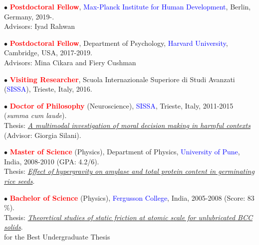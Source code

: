 \documentclass[10pt]{article}
\begin{document}
	\header
	

	$\bullet$ \textbf{\textcolor{red}{Postdoctoral Fellow}}, \textcolor{blue}{Max-Planck Institute for Human Development}, Berlin, Germany, 2019-.\\
	\hspace*{0.1in}Advisors: Iyad Rahwan\\
	\miniskip
	
	$\bullet$ \textbf{\textcolor{red}{Postdoctoral Fellow}}, Department of Psychology, \textcolor{blue}{Harvard University}, Cambridge, USA, 2017-2019.\\
	\hspace*{0.1in}Advisors: Mina Cikara and Fiery Cushman\\
	\miniskip
	
	$\bullet$ \textbf{\textcolor{red}{Visiting Researcher}}, Scuola Internazionale Superiore di Studi Avanzati (\textcolor{blue}{SISSA}), Trieste, Italy, 2016.\\
	
	
	$\bullet$ \textbf{\textcolor{red}{Doctor of Philosophy}} (Neuroscience), \textcolor{blue}{SISSA}, Trieste, Italy, 2011-2015 (\textit{summa cum laude}).\\ 
	\hspace*{0.1in}Thesis: \href{https://drive.google.com/open?id=1g8L7pf-SutYTWt-8yJ44bV96cixMBZuh}{\it A multimodal investigation of moral decision making in harmful contexts} (Advisor: Giorgia Silani).\\
	 \miniskip
	
	$\bullet$ \textbf{\textcolor{red}{Master of Science}} (Physics), Department of Physics, \textcolor{blue}{University of Pune}, India, 2008-2010 (GPA: 4.2/6).\\
	\hspace*{0.1in}Thesis: \href{https://drive.google.com/open?id=0B6_u70YpdJKnMTJEMkI2RkQyNjc2QjJFOTowLjEx}{\it Effect of hypergravity on amylase and total protein content in germinating rice seeds}.
	\miniskip
	
	$\bullet$ \textbf{\textcolor{red}{Bachelor of Science}} (Physics), \textcolor{blue}{Fergusson College}, India, 2005-2008 (Score: 83$\%$).\\
	\hspace*{0.1in}Thesis: \href{https://drive.google.com/open?id=0B6_u70YpdJKnMTIxNTkyODMxMzBBMkYyMDowLjEz}{\it Theoretical studies of static friction at atomic scale for unlubricated BCC solids}.\\
	\hspace*{0.1in}{\it Satish Bhide Prize} for the Best Undergraduate Thesis 
	
\end{document}
